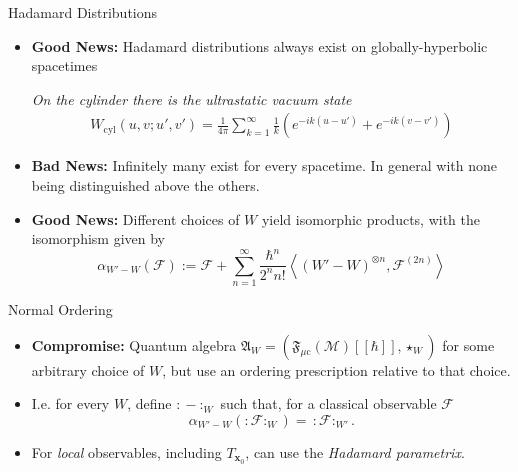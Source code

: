 \documentclass[pdf, fleqn, compress, handout]{beamer}
\newcommand{\nord}[1]{\boldsymbol{:}\!#1\!\boldsymbol{:}}
\newcommand{\mathsterm}[1]{{\itshape\color{dark-teal!80}#1}}
\newcommand{\ourex}[1]{{\itshape\color{viridian!70!black}#1}}
\begin{document}
\begin{frame}{Hadamard Distributions}
	\begin{itemize}
		\item	{\color{ebor}\bfseries Good News:}
				Hadamard distributions always exist on globally-hyperbolic spacetimes
		\pause

		\vspace{1em}
		\ourex{
				On the cylinder there is the \textit{ultrastatic vacuum state}
				\begin{align}
					W_\mathrm{cyl}(u, v; u', v')
						=
					\frac{1}{4 \pi}
					\sum_{k = 1}^\infty
						\frac{1}{k}
						\left( 
							e^{-ik(u - u')} +
							e^{-ik(v - v')}
						\right)
				\end{align}
				}
		\vspace{-1.5em}
		\pause
		\item	{\color{ebor}\bfseries Bad  News:}
				Infinitely many exist for every spacetime.
				In general with none being distinguished above the others.
		\pause
		\item	{\color{ebor}\bfseries Good News:}
				Different choices of $W$ yield isomorphic products,
				with the isomorphism given by
				\begin{equation}
					\alpha_{W' - W}(\mathcal{F})
						:=
					\mathcal{F}
						+
					\sum_{n = 1}^\infty
					\frac{\hbar^{n}}{2^{n} n!}
					\left\langle 
						(W' - W)^{\otimes n},
						\mathcal{F}^{(2n)}
					\right\rangle
				\end{equation}
	\end{itemize}
\end{frame}

\begin{frame}{Normal Ordering}
	\begin{itemize}
		\item	{\color{ebor}\bfseries Compromise:}
				Quantum algebra
				$
				\mathfrak{A}_W
					=
				\left(
					\mathfrak{F}_{\mu \mathrm{c}}(\mathcal{M})[[\hbar]],
					\star_W
				\right)
				$
				for some arbitrary choice of $W$,
				but use an ordering prescription relative to that choice.
		\pause
		\item	I.e. for every $W$, define $\nord{-}_W$ such that,
				for a classical observable $\mathcal{F}$
				\begin{equation}
					\alpha_{W' - W} (\nord{\mathcal{F}}_W)
						=
					\, \nord{\mathcal{F}}_{W'}.
				\end{equation}
		\pause \vspace{-2em}
		\item	For \mathsterm{local} observables,
				including \ourex{$T_{\mathbf{x}_0}$},
				can use the \mathsterm{Hadamard parametrix}.
	\end{itemize}
\end{frame}
\end{document}
